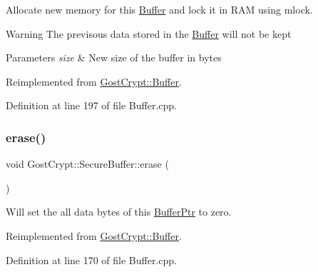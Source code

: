 Allocate new memory for this \hyperlink{class_gost_crypt_1_1_buffer}{Buffer} and lock it in R\+AM using mlock. 

\begin{DoxyWarning}{Warning}
The previsous data stored in the \hyperlink{class_gost_crypt_1_1_buffer}{Buffer} will not be kept 
\end{DoxyWarning}

\begin{DoxyParams}{Parameters}
{\em size} & New size of the buffer in bytes \\
\hline
\end{DoxyParams}


Reimplemented from \hyperlink{class_gost_crypt_1_1_buffer_ab5176ad1ed87433b479f8ccb96b84855}{Gost\+Crypt\+::\+Buffer}.



Definition at line 197 of file Buffer.\+cpp.

\mbox{\label{class_gost_crypt_1_1_secure_buffer_a6b6ee17fb3f8f617112854f9d24e393a}} 
\subsubsection{\texorpdfstring{erase()}{erase()}}
{\footnotesize\ttfamily void Gost\+Crypt\+::\+Secure\+Buffer\+::erase (\begin{DoxyParamCaption}{ }\end{DoxyParamCaption})\hspace{0.3cm}{\ttfamily [virtual]}}



Will set the all data bytes of this \hyperlink{class_gost_crypt_1_1_buffer_ptr}{Buffer\+Ptr} to zero. 



Reimplemented from \hyperlink{class_gost_crypt_1_1_buffer_a6c340b4919d3a0476c6076136fe469a0}{Gost\+Crypt\+::\+Buffer}.



Definition at line 170 of file Buffer.\+cpp.

\mbox{\label{class_gost_crypt_1_1_secure_buffer_a45e814bc17ed85b86733fffc32c69d28}} 

